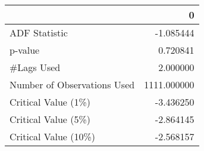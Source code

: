 \begin{tabular}{lr}
\toprule
{} &            0 \\
\midrule
ADF Statistic               &    -1.085444 \\
p-value                     &     0.720841 \\
\#Lags Used                  &     2.000000 \\
Number of Observations Used &  1111.000000 \\
Critical Value (1\%)         &    -3.436250 \\
Critical Value (5\%)         &    -2.864145 \\
Critical Value (10\%)        &    -2.568157 \\
\bottomrule
\end{tabular}
